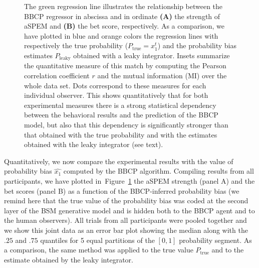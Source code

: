 \documentclass[12pt,english]{article}%
\newcommand{\seeFig}[1]{Figure~\ref{fig:#1}}
\begin{document}
\begin{figure}
{%
The green regression line illustrates the relationship between the BBCP regressor in abscissa
and in ordinate \textbf{(A)} the strength of aSPEM and \textbf{(B)} the bet score, respectively.
As a comparison, we have plotted in blue and orange colors the regression lines
with respectively 
the true probability ($P_{\text{true}}=x_1^t$) and
the probability bias estimates $P_{\text{leaky}}$ obtained with a leaky integrator.
Insets summarize the quantitative measure of this match 
by computing the Pearson correlation coefficient $r$ 
and the mutual information (MI) over the whole data set.
Dots correspond to these measures for each individual observer.
This shows quantitatively that for both experimental measures
there is a strong statistical dependency between
the behavioral results and the prediction of the BBCP model,
but also that this dependency is significantly stronger than that obtained
with the true probability and with the estimates obtained with the leaky integrator
(see text). %
}
\label{fig:results_psycho_all}
\end{figure}
Quantitatively, we now compare the experimental results
with the value of probability bias $\hat{x_1}$
computed by the BBCP algorithm.
Compiling results %
from all participants,
we have plotted in~\seeFig{results_psycho_all}
the aSPEM strength (panel A) and the bet scores (panel B) as a function of the BBCP-inferred probability bias
(we remind here that the true value of the probability bias was coded at the second layer of the BSM generative model and is hidden both to the BBCP agent and to the human observers).
All trials from all participants were pooled together 
and we show this joint data as an error bar plot 
showing the median along with the $.25$ and $.75$ quantiles
for 5 equal partitions of the $[0, 1]$ probability segment. %
As a comparison, the same method was applied to the true value $P_{\text{true}}$ and 
to the estimate obtained by the leaky integrator.
\end{document}
